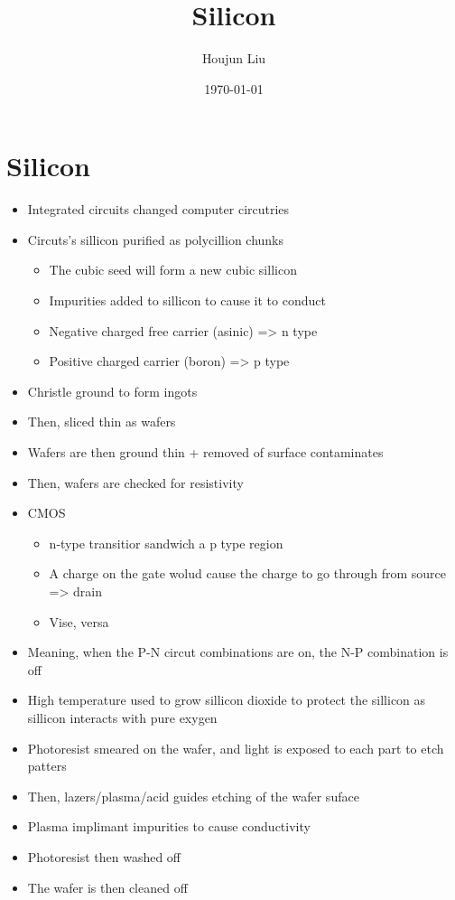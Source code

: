\documentclass[letterpaper]{article}
\author{Houjun Liu}
\date{\today}
\title{Silicon}
\renewcommand{\tableofcontents}{}
\begin{document}
\tableofcontents



\section{Silicon}
\label{sec:orgd7c4905}
\begin{itemize}
\item Integrated circuits changed computer circutries

\item Circuts's sillicon purified as polycillion chunks

\begin{itemize}
\item The cubic seed will form a new cubic sillicon
\item Impurities added to sillicon to cause it to conduct
\item Negative charged free carrier (asinic) => n type
\item Positive charged carrier (boron) => p type
\end{itemize}

\item Christle ground to form ingots

\item Then, sliced thin as wafers

\item Wafers are then ground thin + removed of surface contaminates

\item Then, wafers are checked for resistivity

\item CMOS

\begin{itemize}
\item n-type transitior sandwich a p type region
\item A charge on the gate wolud cause the charge to go through from
source => drain
\item Vise, versa
\end{itemize}

\item Meaning, when the P-N circut combinations are on, the N-P combination
is off\\

\item High temperature used to grow sillicon dioxide to protect the sillicon
as sillicon interacts with pure exygen

\item Photoresist smeared on the wafer, and light is exposed to each part to
etch patters

\item Then, lazers/plasma/acid guides etching of the wafer suface

\item Plasma implimant impurities to cause conductivity

\item Photoresist then washed off

\item The wafer is then cleaned off
\end{itemize}
\end{document}
